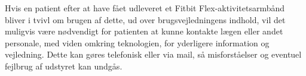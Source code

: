 Hvis en patient efter at have fået udleveret et Fitbit Flex-aktivitetsarmbånd bliver i tvivl om brugen af dette, ud over brugsvejledningens indhold, vil det muligvis være nødvendigt for patienten at kunne kontakte lægen eller andet personale, med viden omkring teknologien, for yderligere information og vejledning. Dette kan gøres telefonisk eller via mail, så misforståelser og eventuel fejlbrug af udstyret kan undgås. 





